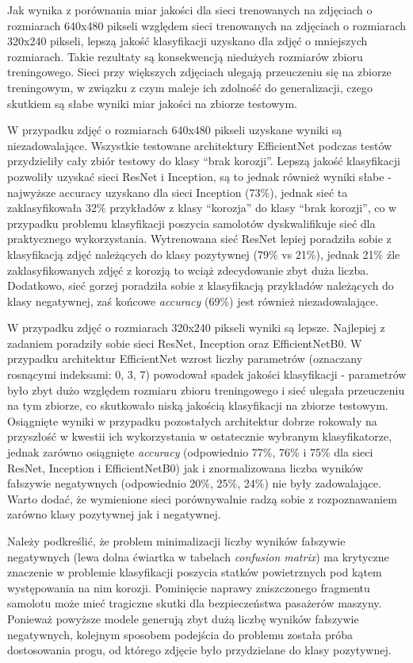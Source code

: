 \documentclass[polish,12pt]{aghthesis}
\begin{document}
\par Jak wynika z porównania miar jakości dla sieci trenowanych na zdjęciach o rozmiarach 640x480 pikseli względem sieci trenowanych na zdjęciach o rozmiarach 320x240 pikseli, lepszą jakość klasyfikacji uzyskano dla zdjęć o mniejszych rozmiarach. Takie rezultaty są konsekwencją niedużych rozmiarów zbioru treningowego. Sieci przy większych zdjęciach ulegają przeuczeniu się na zbiorze treningowym, w związku z czym maleje ich zdolność do generalizacji, czego skutkiem są słabe wyniki miar jakości na zbiorze testowym.
\par W przypadku zdjęć o rozmiarach 640x480 pikseli uzyskane wyniki są niezadowalające. Wszystkie testowane architektury EfficientNet podczas testów przydzieliły cały zbiór testowy do klasy ``brak korozji''. Lepszą jakość klasyfikacji pozwoliły uzyskać sieci ResNet i Inception, są to jednak również wyniki słabe - najwyższe accuracy uzyskano dla sieci Inception (73\%), jednak sieć ta zaklasyfikowała 32\% przykładów z klasy ``korozja'' do klasy ``brak korozji'', co w przypadku problemu klasyfikacji poszycia samolotów dyskwalifikuje sieć dla praktycznego wykorzystania. Wytrenowana sieć ResNet lepiej poradziła sobie z klasyfikacją zdjęć należących do klasy pozytywnej (79\% vs 21\%), jednak 21\% źle zaklasyfikowanych zdjęć z korozją to wciąż zdecydowanie zbyt duża liczba. Dodatkowo, sieć gorzej poradziła sobie z klasyfikacją przykładów należących do klasy negatywnej, zaś końcowe \textit{accuracy} (69\%) jest również niezadowalające.
\par W przypadku zdjęć o rozmiarach 320x240 pikseli wyniki są lepsze. Najlepiej z zadaniem poradziły sobie sieci ResNet, Inception oraz EfficientNetB0. W przypadku architektur EfficientNet wzrost liczby parametrów (oznaczany rosnącymi indeksami: 0, 3, 7) powodował spadek jakości klasyfikacji - parametrów było zbyt dużo względem rozmiaru zbioru treningowego i sieć ulegała przeuczeniu na tym zbiorze, co skutkowało niską jakością klasyfikacji na zbiorze testowym. Osiągnięte wyniki w przypadku pozostałych architektur dobrze rokowały na przyszłość w kwestii ich wykorzystania w ostatecznie wybranym klasyfikatorze, jednak zarówno osiągnięte \textit{accuracy} (odpowiednio 77\%, 76\% i 75\% dla sieci ResNet, Inception i EfficientNetB0) jak i znormalizowana liczba wyników fałszywie negatywnych (odpowiednio 20\%, 25\%, 24\%) nie były zadowalające. Warto dodać, że wymienione sieci porównywalnie radzą sobie z rozpoznawaniem zarówno klasy pozytywnej jak i negatywnej.
\par Należy podkreślić, że problem minimalizacji liczby wyników fałszywie negatywnych (lewa dolna ćwiartka w tabelach \textit{confusion matrix}) ma krytyczne znaczenie w problemie klasyfikacji poszycia statków powietrznych pod kątem występowania na nim korozji. Pominięcie naprawy zniszczonego fragmentu samolotu może mieć tragiczne skutki dla bezpieczeństwa pasażerów maszyny. Ponieważ powyższe modele generują zbyt dużą liczbę wyników fałszywie negatywnych, kolejnym sposobem podejścia do problemu została próba dostosowania progu, od którego zdjęcie było przydzielane do klasy pozytywnej.
\end{document}
